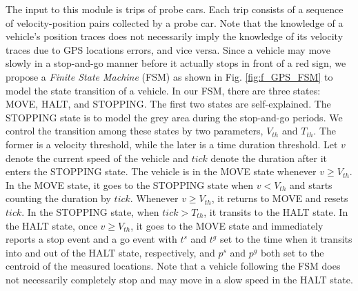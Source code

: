 \documentclass[final,oneside,onecolumn,12pt,a4paper]{book}%
\begin{document}
The input to this module is trips of probe cars. Each trip consists of a
sequence of velocity-position pairs collected by a probe car. Note that the
knowledge of a vehicle's position traces does not necessarily imply the
knowledge of its velocity traces due to GPS locations errors, and vice versa.
Since a vehicle may move slowly in a stop-and-go manner before it actually
stops in front of a red sign, we propose a \emph{Finite State Machine} (FSM)
as shown in Fig. \ref{fig:f_GPS_FSM} to model the state transition of a
vehicle. In our FSM, there are three states: MOVE, HALT, and STOPPING. The
first two states are self-explained. The STOPPING state is to model the grey
area during the stop-and-go periods. We control the transition among these
states by two parameters, $V_{th}$ and $T_{th}$. The former is a velocity
threshold, while the later is a time duration threshold. Let $v$ denote the
current speed of the vehicle and $tick$ denote the duration after it enters
the STOPPING state. The vehicle is in the MOVE state whenever $v\geq V_{th}$.
In the MOVE state, it goes to the STOPPING state when $v<V_{th}$ and starts
counting the duration by $tick$. Whenever $v\geq V_{th}$, it returns to MOVE
and resets $tick$. In the STOPPING state, when $tick>T_{th}$, it transits to
the HALT state. In the HALT state, once $v\geq V_{th}$, it goes to the MOVE
state and immediately reports a stop event and a go event with $t^{s}$ and
$t^{g}$ set to the time when it transits into and out of the HALT state,
respectively, and $p^{s}$ and $p^{g}$ both set to the centroid of the measured
locations.
Note that a vehicle following the FSM does not necessarily completely stop and
may move in a slow speed in the HALT state.
\end{document}
